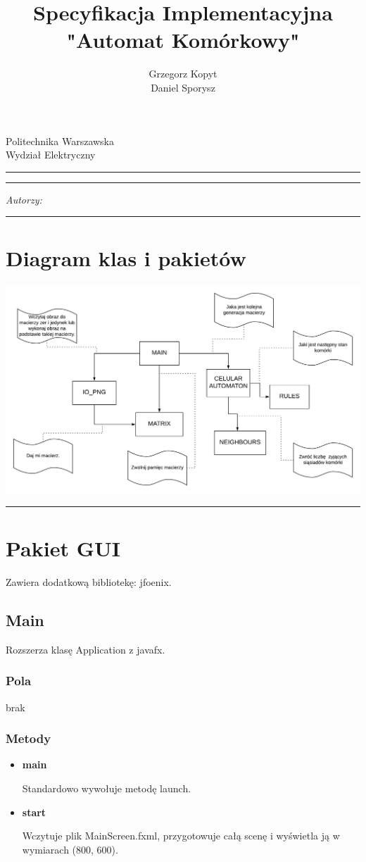 \documentclass[a4paper,11pt]{article}
\author{Grzegorz Kopyt\\
Daniel Sporysz}
\title{Specyfikacja Implementacyjna \\
"Automat Komórkowy"}
\makeatletter
\newcommand{\linia}{\rule{\linewidth}{0.4mm}}
\renewcommand{\maketitle}{\begin{titlepage}
    \vspace*{2cm}
    \begin{center}\LARGE
    Politechnika Warszawska\\
    Wydział Elektryczny\\
    \end{center}
    \vspace{5cm}
    \noindent\linia
    \begin{center}
      \LARGE \textsc{\@title}
         \end{center}
     \linia
    \vspace{0.5cm}
    \begin{flushright}
    \begin{minipage}{5cm}
    \textit{Autorzy:}\\
    \normalsize \textsc{\@author} \par
    \end{minipage}
    \vspace{5cm}
     \end{flushright}
    \vspace*{\stretch{6}}
    \begin{center}
    \@date
    \end{center}
  \end{titlepage}%
}
\makeatother
\begin{document}
\maketitle


\tableofcontents
\vspace{1cm}
\noindent\linia





\section{Diagram klas i pakietów}


\includegraphics[width=\textwidth]{Automat2}






\noindent\linia
\section{Pakiet GUI}

Zawiera dodatkową bibliotekę: jfoenix.

\subsection{Main}
Rozszerza klasę Application z javafx.
\subsubsection{Pola}
brak
\subsubsection{Metody}
\begin{itemize}
\item \textbf{main}

Standardowo wywołuje metodę launch.
\item \textbf{start}

Wczytuje plik MainScreen.fxml, przygotowuje całą scenę i wyświetla ją w wymiarach (800, 600).
\end{itemize}
\end{document}
